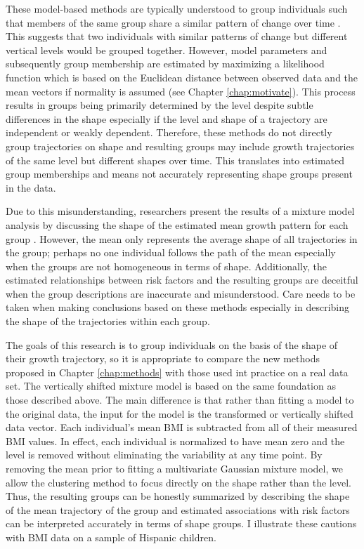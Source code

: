 These model-based methods are typically understood to group individuals such that members of the same group share a similar pattern of change over time \cite{garden2012}. This suggests that two individuals with similar patterns of change but different vertical levels would be grouped together. However, model parameters and subsequently group membership are estimated by maximizing a likelihood function which is based on the Euclidean distance between observed data and the mean vectors if normality is assumed (see Chapter \ref{chap:motivate}). This process results in groups being primarily determined by the level despite subtle differences in the shape especially if the level and shape of a trajectory are independent or weakly dependent. Therefore, these methods do not directly group trajectories on shape and resulting groups may include growth trajectories of the same level but different shapes over time. This translates into estimated group memberships and means not accurately representing shape groups present in the data.

Due to this misunderstanding, researchers present the results of a mixture model analysis by discussing the shape of the estimated mean growth pattern for each group \cite{pryor2011,carter2012}. However, the mean only represents the average shape of all trajectories in the group; perhaps no one individual follows the path of the mean especially when the groups are not homogeneous in terms of shape. Additionally, the estimated relationships between risk factors and the resulting groups are deceitful when the group descriptions are inaccurate and misunderstood. Care needs to be taken when making conclusions based on these methods especially in describing the shape of the trajectories within each group.  

The goals of this research is to group individuals on the basis of the shape of their growth trajectory, so it is appropriate to compare the new methods proposed in Chapter \ref{chap:methods} with those used int practice on a real data set. The vertically shifted mixture model is based on the same foundation as those described above. The main difference is that rather than fitting a model to the original data, the input for the model is the transformed or vertically shifted data vector. Each individual's mean BMI is subtracted from all of their measured BMI values. In effect, each individual is normalized to have mean zero and the level is removed without eliminating the variability at any time point. By removing the mean prior to fitting a multivariate Gaussian mixture model, we allow the clustering method to focus directly on the shape rather than the level. Thus, the resulting groups can be honestly summarized by describing the shape of the mean trajectory of the group and estimated associations with risk factors can be interpreted accurately in terms of shape groups. I illustrate these cautions with BMI data on a sample of Hispanic children.


